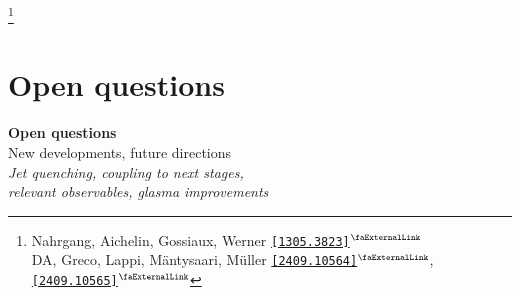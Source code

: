 \documentclass[aspectratio=169,11pt,usenames,dvipsnames]{beamer}
\renewcommand{\thefootnote}{\color{customblue}\faPaperPlaneO}
\newcommand\blfootnote[1]{%
  \begingroup
  \renewcommand\thefootnote{}\footnote{#1}%
  \addtocounter{footnote}{-1}%
  \endgroup
}
\begin{document}
\begin{frame}[noframenumbering]
    \begin{center}
        \vspace{-10pt}
    \end{center}

    \vspace{-30pt}
    \blfootnote{\scriptsize Nahrgang, Aichelin, Gossiaux, Werner \href{https://arxiv.org/abs/1305.3823}{{\color{Orange}\texttt{[1305.3823]$^\text{\scalebox{0.9}{\faExternalLink}}$}}}\\
    \scriptsize\hspace{14pt} DA, Greco, Lappi, Mäntysaari, M\"{u}ller \href{https://arxiv.org/abs/2409.10564}{\color{palgold}\texttt{[2409.10564]}$^\text{\scalebox{0.9}{\faExternalLink}}$}, \href{https://arxiv.org/abs/2409.10565}{\color{palgold}\texttt{[2409.10565]}$^\text{\scalebox{0.9}{\faExternalLink}}$}}
\end{frame}



\section{Open questions}

\begin{frame}{}
    \begin{center}
        \vspace{1cm}
        {\huge\color{jyured}\bfseries Open questions}\\[0.4cm]
        {\Large\color{normal} New developments, future directions}\\[0.4cm]
        {\large\textit{Jet quenching, coupling to next stages,\\relevant observables, glasma improvements}}
    \end{center}
\end{frame}
\end{document}
